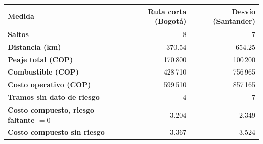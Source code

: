 \renewcommand{\arraystretch}{1.2}
\begin{tabular}{|l|r|r|}
\hline
\rowcolor{gray!20} \textbf{Medida} & \textbf{Ruta corta (Bogotá)} & \textbf{Desvío (Santander)} \\
\hline
\textbf{Saltos} & 8 & 7 \\
\hline
\textbf{Distancia (km)} & 370.54 & 654.25 \\
\hline
\textbf{Peaje total (COP)} & 170\,800 & 100\,200 \\
\hline
\textbf{Combustible (COP)} & 428\,710 & 756\,965 \\
\hline
\textbf{Costo operativo (COP)} & 599\,510 & 857\,165 \\
\hline
\textbf{Tramos sin dato de riesgo} & 4 & 7 \\
\hline
\textbf{Costo compuesto, riesgo faltante $=0$} & 3.204 & 2.349 \\
\hline
\textbf{Costo compuesto sin riesgo} & 3.367 & 3.524 \\
\hline
\end{tabular}
